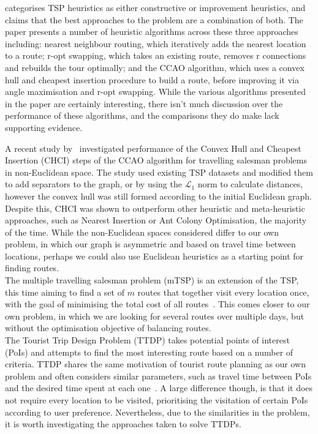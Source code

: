\textcite{laporte1992traveling} categorises TSP heuristics as either constructive or improvement heuristics, and
claims that the best approaches to the problem are a combination of both.
The paper presents a number of heuristic algorithms across these three approaches including: nearest neighbour
routing, which iteratively adds the nearest location to a route; r-opt swapping, which takes an existing route,
removes r connections and rebuilds the tour optimally; and the CCAO algorithm, which uses a convex hull and cheapest
insertion procedure to build a route, before improving it via angle maximisation and r-opt swapping.
While the various algorithms presented in the paper are certainly interesting, there isn't much discussion over the
performance of these algorithms, and the comparisons they do make lack supporting evidence.


A recent study by~\textcite{goutham2023convex} investigated performance of the Convex Hull and Cheapest Insertion (CHCI)
steps of the CCAO algorithm for travelling salesman problems in non-Euclidean space.
The study used existing TSP datasets and modified them to add separators to the graph, or by using the $\mathcal{L}_1$
norm to calculate distances, however the convex hull was still formed according to the initial Euclidean graph.
Despite this, CHCI was shown to outperform other heuristic and meta-heuristic approaches, such as Nearest Insertion or
Ant Colony Optimisation, the majority of the time.
While the non-Euclidean spaces considered differ to our own problem, in which our graph is asymmetric and based on
travel time between locations, perhaps we could also use Euclidean heuristics as a starting point for finding routes.\\

\noindent
The multiple travelling salesman problem (mTSP) is an extension of the TSP, this time aiming to find a set of $m$
routes that together visit every location once, with the goal of minimising the total cost of all
routes~\parencite[p. 209]{bektas2006multiple}.
This comes closer to our own problem, in which we are looking for several routes over multiple days, but without the
optimisation objective of balancing routes.\\

\noindent
The Tourist Trip Design Problem (TTDP) takes potential points of interest (PoIs) and attempts to find the most
interesting route based on a number of criteria.
TTDP shares the same motivation of tourist route planning as our own problem and often considers similar parameters,
such as travel time between PoIs and the desired time spent at each one~\parencite{vansteenwegen2007mobile}.
A large difference though, is that it does not require every location to be visited, prioritising the visitation of
certain PoIs according to user preference.
Nevertheless, due to the similarities in the problem, it is worth investigating the approaches taken to solve TTDPs.

